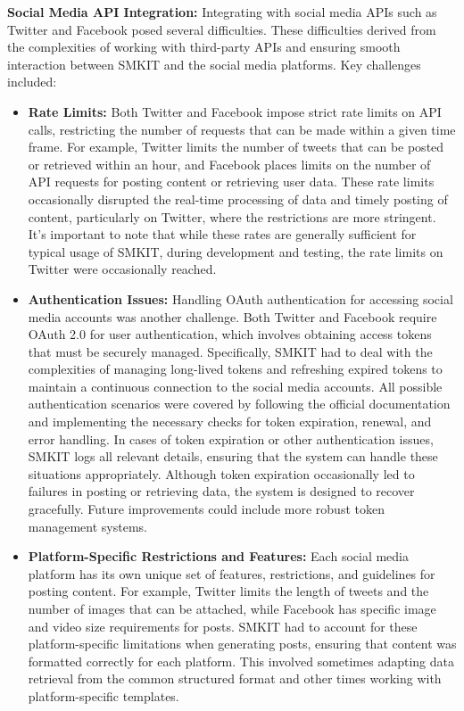 \textbf{Social Media API Integration:} Integrating with social media APIs such as Twitter and Facebook posed several difficulties. These difficulties derived from the complexities of working with third-party APIs and ensuring smooth interaction between SMKIT and the social media platforms. Key challenges included:

\begin{itemize}
    \item \textbf{Rate Limits:} Both Twitter and Facebook impose strict rate limits on API calls, restricting the number of requests that can be made within a given time frame. For example, Twitter limits the number of tweets that can be posted or retrieved within an hour, and Facebook places limits on the number of API requests for posting content or retrieving user data. These rate limits occasionally disrupted the real-time processing of data and timely posting of content, particularly on Twitter, where the restrictions are more stringent. It's important to note that while these rates are generally sufficient for typical usage of SMKIT, during development and testing, the rate limits on Twitter were occasionally reached.

    \item \textbf{Authentication Issues:} Handling OAuth authentication for accessing social media accounts was another challenge. Both Twitter and Facebook require OAuth 2.0 for user authentication, which involves obtaining access tokens that must be securely managed. Specifically, SMKIT had to deal with the complexities of managing long-lived tokens and refreshing expired tokens to maintain a continuous connection to the social media accounts. All possible authentication scenarios were covered by following the official documentation and implementing the necessary checks for token expiration, renewal, and error handling. In cases of token expiration or other authentication issues, SMKIT logs all relevant details, ensuring that the system can handle these situations appropriately. Although token expiration occasionally led to failures in posting or retrieving data, the system is designed to recover gracefully. Future improvements could include more robust token management systems.

    \item \textbf{Platform-Specific Restrictions and Features:} Each social media platform has its own unique set of features, restrictions, and guidelines for posting content. For example, Twitter limits the length of tweets and the number of images that can be attached, while Facebook has specific image and video size requirements for posts. SMKIT had to account for these platform-specific limitations when generating posts, ensuring that content was formatted correctly for each platform. This involved sometimes adapting data retrieval from the common structured format and other times working with platform-specific templates.

\end{itemize}

